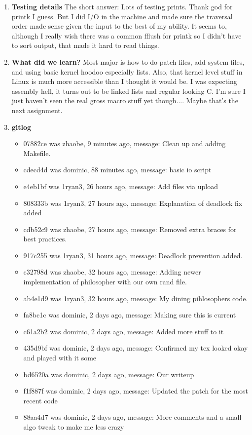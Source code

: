 \documentclass[IEEEtran,letterpaper,10pt,notitlepage,draftclsnofoot,onecolumn]{article}
\begin{document}
\begin{enumerate}
\item
\textbf{Testing details}
The short answer: Lots of testing prints. Thank god for
printk I guess. But I did I/O in the machine and made sure
the traversal order made sense given the input to the best
of my ability. It seems to, although I really wish there
was a common fflush for printk so I didn't have to sort 
output, that made it hard to read things.
\item
\textbf{What did we learn?}
Most major is how to do patch files, add system files,
and using basic kernel hoodoo especially lists.
Also, that kernel level stuff in Linux is much more
accessible than I thought it would be. I was expecting
assembly hell, it turns out to be linked lists and regular
looking C. I'm sure I just haven't seen the real gross
macro stuff yet though....
Maybe that's the next assignment.
\item
\textbf{gitlog}
\begin{itemize}
\item 07882ce was zhaobe, 9 minutes ago, message: Clean up and adding Makefile.
\item cdecd4d was dominic, 88 minutes ago, message: basic io script
\item e4eb1bf was 1ryan3, 26 hours ago, message: Add files via upload
\item 808333b was 1ryan3, 27 hours ago, message: Explanation of deadlock fix added
\item cdb52c9 was zhaobe, 27 hours ago, message: Removed extra braces for best practices.
\item 917c255 was 1ryan3, 31 hours ago, message: Deadlock prevention added.
\item c32798d was zhaobe, 32 hours ago, message: Adding newer implementation of philosopher with our own rand file.
\item ab4e1d9 was 1ryan3, 32 hours ago, message: My dining pihlosophers code.
\item fa8bc1c was dominic, 2 days ago, message: Making sure this is current
\item c61a2b2 was dominic, 2 days ago, message: Added more stuff to it
\item 435d9bf was dominic, 2 days ago, message: Confirmed my tex looked okay and played with it some
\item bd6520a was dominic, 2 days ago, message: Our writeup
\item f1f887f was dominic, 2 days ago, message: Updated the patch for the most recent code
\item 88aa4d7 was dominic, 2 days ago, message: More comments and a small algo tweak to make me less crazy

\end{itemize}
\end{enumerate}
\end{document}

